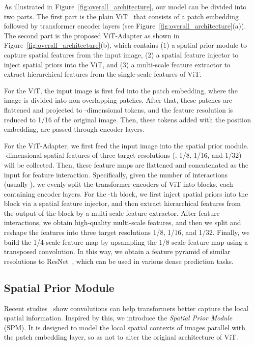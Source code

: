 \documentclass{article} \usepackage{iclr2023_conference,times}
\begin{document}
As illustrated in Figure~\ref{fig:overall_architecture}, our model can be divided into two parts. The first part is the plain ViT~\citep{dosovitskiy2020image} that consists of a patch embedding followed by  transformer encoder layers (see Figure~\ref{fig:overall_architecture}(a)).
The second part is the proposed ViT-Adapter as shown in Figure~\ref{fig:overall_architecture}(b), which contains (1) a spatial prior module to capture spatial features from the input image, 
(2) a spatial feature injector to inject spatial priors into the ViT, and (3) a multi-scale feature extractor to extract hierarchical features from the single-scale features of ViT.

For the ViT, the input image is first fed into the patch embedding, where the image is divided into  non-overlapping patches. 
After that, these patches are flattened and projected to -dimensional tokens, and the feature resolution is reduced to 1/16 of the original image.
Then, these tokens added with the position embedding, are passed through  encoder layers.


For the ViT-Adapter, we first feed the input image into the spatial prior module.
-dimensional spatial features of three target resolutions (\ie, 1/8, 1/16, and 1/32) will be collected.
Then, these feature maps are flattened and concatenated as the input for feature interaction.
Specifically, given the number of interactions  (usually ), we evenly split the transformer encoders of ViT into  blocks, each containing  encoder layers.
For the -th block, we first inject spatial priors  into the block via a spatial feature injector, and then extract hierarchical features from the output of the block by a multi-scale feature extractor.
After  feature interactions, we obtain high-quality multi-scale features, and then we split and reshape the features into three target resolutions 1/8, 1/16, and 1/32.
Finally, we build the 1/4-scale feature map by upsampling the 1/8-scale feature map using a  transposed convolution.
In this way, we obtain a feature pyramid of similar resolutions to ResNet~\citep{he2016deep}, which can be used in various dense prediction tasks.


\subsection{Spatial Prior Module}

Recent studies~\citep{wang2021pvtv2,wu2021cvt,fang2022unleashing,park2022vision} show convolutions can help transformers better capture the local spatial information.
Inspired by this, we introduce the \emph{Spatial Prior Module} (SPM).
It is designed to model the local spatial contexts of images parallel with the patch embedding layer, so as not to alter the original architecture of ViT.
\end{document}
